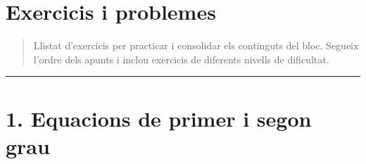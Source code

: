 \documentclass[13pt,a4paper]{extarticle}
\begin{document}
\section*{Exercicis i problemes}

\begin{quote}\small Llistat d'exercicis per practicar i consolidar els continguts del bloc. Segueix l'ordre dels apunts i inclou exercicis de diferents nivells de dificultat.\end{quote}



\vspace{1mm}\hrule\vspace{3mm}

\section*{1. Equacions de primer i segon grau}
\end{document}
